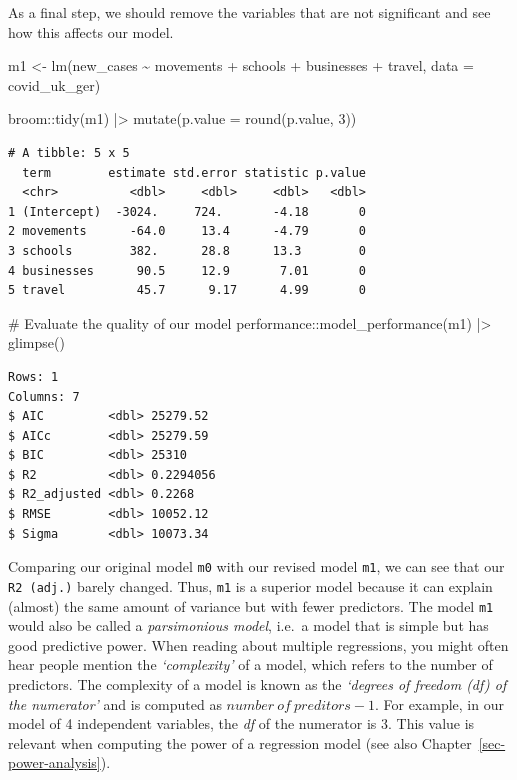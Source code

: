 \documentclass[
  letterpaper,
]{krantz}
\makeatletter
\newenvironment{Shaded}{\begin{snugshade}}{\end{snugshade}}
\newcommand{\AttributeTok}[1]{\textcolor[rgb]{0.40,0.45,0.13}{#1}}
\newcommand{\CommentTok}[1]{\textcolor[rgb]{0.37,0.37,0.37}{#1}}
\newcommand{\DecValTok}[1]{\textcolor[rgb]{0.68,0.00,0.00}{#1}}
\newcommand{\FunctionTok}[1]{\textcolor[rgb]{0.28,0.35,0.67}{#1}}
\newcommand{\NormalTok}[1]{\textcolor[rgb]{0.00,0.23,0.31}{#1}}
\newcommand{\OtherTok}[1]{\textcolor[rgb]{0.00,0.23,0.31}{#1}}
\newcommand{\SpecialCharTok}[1]{\textcolor[rgb]{0.37,0.37,0.37}{#1}}
\newenvironment{kframe}{%
\medskip{}
\setlength{\fboxsep}{.8em}
 \def\at@end@of@kframe{}%
 \ifinner\ifhmode%
  \def\at@end@of@kframe{\end{minipage}}%
  \begin{minipage}{\columnwidth}%
 \fi\fi%
 \def\FrameCommand##1{\hskip\@totalleftmargin \hskip-\fboxsep
 \colorbox{shadecolor}{##1}\hskip-\fboxsep
     \hskip-\linewidth \hskip-\@totalleftmargin \hskip\columnwidth}%
 \MakeFramed {\advance\hsize-\width
   \@totalleftmargin\z@ \linewidth\hsize
   \@setminipage}}%
 {\par\unskip\endMakeFramed%
 \at@end@of@kframe}
\renewenvironment{Shaded}{\begin{kframe}}{\end{kframe}}
\makeatother
\begin{document}
As a final step, we should remove the variables that are not significant
and see how this affects our model.

\begin{Shaded}
\begin{Highlighting}[]
\NormalTok{m1 }\OtherTok{\textless{}{-}} \FunctionTok{lm}\NormalTok{(new\_cases }\SpecialCharTok{\textasciitilde{}}\NormalTok{ movements }\SpecialCharTok{+}\NormalTok{ schools }\SpecialCharTok{+}\NormalTok{ businesses }\SpecialCharTok{+}\NormalTok{ travel,}
         \AttributeTok{data =}\NormalTok{ covid\_uk\_ger)}

\NormalTok{broom}\SpecialCharTok{::}\FunctionTok{tidy}\NormalTok{(m1) }\SpecialCharTok{|\textgreater{}}
  \FunctionTok{mutate}\NormalTok{(}\AttributeTok{p.value =} \FunctionTok{round}\NormalTok{(p.value, }\DecValTok{3}\NormalTok{))}
\end{Highlighting}
\end{Shaded}

\begin{verbatim}
# A tibble: 5 x 5
  term        estimate std.error statistic p.value
  <chr>          <dbl>     <dbl>     <dbl>   <dbl>
1 (Intercept)  -3024.     724.       -4.18       0
2 movements      -64.0     13.4      -4.79       0
3 schools        382.      28.8      13.3        0
4 businesses      90.5     12.9       7.01       0
5 travel          45.7      9.17      4.99       0
\end{verbatim}

\begin{Shaded}
\begin{Highlighting}[]
\CommentTok{\# Evaluate the quality of our model}
\NormalTok{performance}\SpecialCharTok{::}\FunctionTok{model\_performance}\NormalTok{(m1) }\SpecialCharTok{|\textgreater{}}
  \FunctionTok{glimpse}\NormalTok{()}
\end{Highlighting}
\end{Shaded}

\begin{verbatim}
Rows: 1
Columns: 7
$ AIC         <dbl> 25279.52
$ AICc        <dbl> 25279.59
$ BIC         <dbl> 25310
$ R2          <dbl> 0.2294056
$ R2_adjusted <dbl> 0.2268
$ RMSE        <dbl> 10052.12
$ Sigma       <dbl> 10073.34
\end{verbatim}

Comparing our original model \texttt{m0} with our revised model
\texttt{m1}, we can see that our \texttt{R2\ (adj.)} barely changed.
Thus, \texttt{m1} is a superior model because it can explain (almost)
the same amount of variance but with fewer predictors. The model
\texttt{m1} would also be called a \emph{parsimonious model}, i.e.~a
model that is simple but has good predictive power. When reading about
multiple regressions, you might often hear people mention the
\emph{`complexity'} of a model, which refers to the number of
predictors. The complexity of a model is known as the \emph{`degrees of
freedom (df) of the numerator'} and is computed as
\(number\ of\ preditors - 1\). For example, in our model of 4
independent variables, the \emph{df} of the numerator is 3. This value
is relevant when computing the power of a regression model (see also
Chapter~\ref{sec-power-analysis}).
\end{document}
